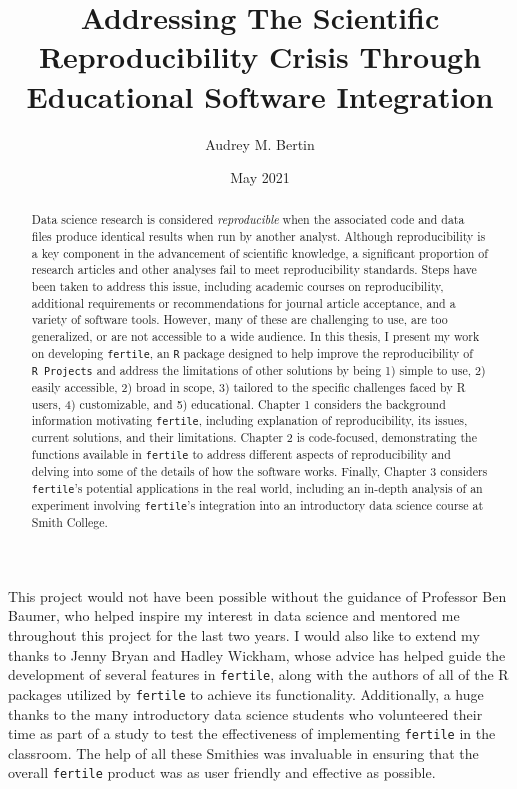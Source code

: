 \documentclass[12pt,twoside]{reedthesis}
\title{Addressing The Scientific Reproducibility Crisis Through Educational Software Integration}
\author{Audrey M. Bertin}
\date{May 2021}
\begin{document}
  \maketitle

\frontmatter %
\pagestyle{empty} %
  \begin{acknowledgements}
    This project would not have been possible without the guidance of Professor Ben Baumer, who helped inspire my interest in data science and mentored me throughout this project for the last two years.
    I would also like to extend my thanks to Jenny Bryan and Hadley Wickham, whose advice has helped guide the development of several features in \texttt{fertile}, along with the authors of all of the R packages utilized by \texttt{fertile} to achieve its functionality.
    Additionally, a huge thanks to the many introductory data science students who volunteered their time as part of a study to test the effectiveness of implementing \texttt{fertile} in the classroom. The help of all these Smithies was invaluable in ensuring that the overall \texttt{fertile} product was as user friendly and effective as possible.
  \end{acknowledgements}

  \hypersetup{linkcolor=black}
  \setcounter{secnumdepth}{2}
  \setcounter{tocdepth}{2}
  \tableofcontents


  \listoffigures
  \begin{abstract}
    Data science research is considered \emph{reproducible} when the associated code and data files produce identical results when run by another analyst. Although reproducibility is a key component in the advancement of scientific knowledge, a significant proportion of research articles and other analyses fail to meet reproducibility standards. Steps have been taken to address this issue, including academic courses on reproducibility, additional requirements or recommendations for journal article acceptance, and a variety of software tools. However, many of these are challenging to use, are too generalized, or are not accessible to a wide audience. In this thesis, I present my work on developing \texttt{fertile}, an \texttt{R} package designed to help improve the reproducibility of \texttt{R\ Projects} and address the limitations of other solutions by being 1) simple to use, 2) easily accessible, 2) broad in scope, 3) tailored to the specific challenges faced by R users, 4) customizable, and 5) educational. Chapter 1 considers the background information motivating \texttt{fertile}, including explanation of reproducibility, its issues, current solutions, and their limitations. Chapter 2 is code-focused, demonstrating the functions available in \texttt{fertile} to address different aspects of reproducibility and delving into some of the details of how the software works. Finally, Chapter 3 considers \texttt{fertile}'s potential applications in the real world, including an in-depth analysis of an experiment involving \texttt{fertile}'s integration into an introductory data science course at Smith College.
  \end{abstract}
\end{document}
